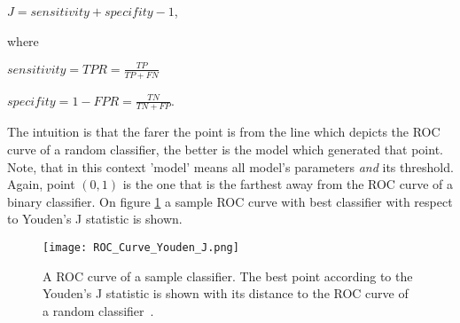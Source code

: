 \documentclass[a4paper,10pt]{report}
\begin{document}
\begin{appendices}
      \begin{center}
      $J = sensitivity + specifity - 1$,
      \end{center}

      
      where
      \begin{center}
      $sensitivity = TPR = \frac{TP}{TP + FN}$
       
      $specifity = 1 - FPR = \frac{TN}{TN + FP}$.
      \end{center}
      
      The intuition is that the farer the point is from the line which depicts the ROC curve of a random classifier, the better is the model which generated that point. Note, that in this context 'model' means all model's parameters \emph{and} its threshold. Again, point $(0,1)$ is the one that is the farthest away from the ROC curve of a binary classifier. On figure \ref{fig:YOUDEN} a sample ROC curve with best classifier with respect to Youden's J statistic is shown.
      
      \begin{figure}[h!]
	  \centering
	  \texttt{[image: ROC\_Curve\_Youden\_J.png]}
	  \caption{A ROC curve of a sample classifier. The best point according to the Youden's J statistic is shown with its distance to the ROC curve of a random classifier~\cite{bibYOUDEN}.}
	  \label{fig:YOUDEN}
      \end{figure} 
      
      
      
  \end{appendices}
      
\end{document}
